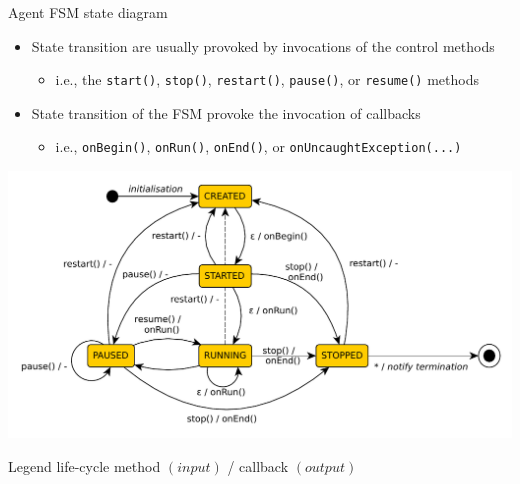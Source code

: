\documentclass[presentation]{beamer}\mode<presentation>{\usetheme{AMSCesenaPurpleAndGold}}
\begin{document}
\begin{frame}[allowframebreaks]{Agent FSM state diagram}
\begin{itemize}
        \framebreak

        \item State transition are usually provoked by invocations of the \alert{control methods}
        \begin{itemize}
        	\item i.e., the \texttt{start()}, \texttt{stop()}, \texttt{restart()}, \texttt{pause()}, or \texttt{resume()} methods
        \end{itemize}



        \bigskip

        \item State transition of the FSM provoke the invocation of callbacks
        \begin{itemize}
        	\item i.e., \texttt{onBegin()}, \texttt{onRun()}, \texttt{onEnd()}, or \texttt{onUncaughtException(...)}
        \end{itemize}
    \end{itemize}

    \framebreak

    \begin{center}
        \includegraphics[width=.8\linewidth]{img/fsm.pdf}
    \end{center}

    \begin{block}{Legend}\centering
        life-cycle method $(input)$ / callback $(output)$
    \end{block}

\end{frame}
\end{document}
